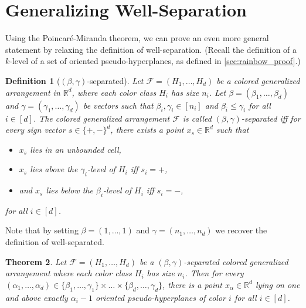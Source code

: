 \documentclass[11pt]{article}
\newtheorem{theorem}{Theorem}
\newtheorem{definition}[theorem]{Definition}
\begin{document}
\section{Generalizing Well-Separation}\label{sec:generalized_separation}
Using the Poincar\'{e}-Miranda theorem, we can prove an even more general statement by relaxing the definition of well-separation. (Recall the definition of a $k$-level of a set of oriented pseudo-hyperplanes, as defined in \cref{sec:rainbow_proof}.) 
%
\begin{definition}[$(\beta,\gamma)$-separated]
\label{def:generalized_separation}
Let $\mathcal{F}=(H_1, \dots, H_d)$ be a colored generalized arrangement in $\mathbb{R}^d$, where each color class $H_i$ has size $n_i$. Let $\beta=(\beta_1,\ldots,\beta_d)$ and $\gamma=(\gamma_1,\ldots,\gamma_d)$ be vectors such that $\beta_i, \gamma_i \in [n_i]$ and $\beta_i\leq \gamma_i$ for all $i \in [d]$.
The colored generalized arrangement $\mathcal{F}$ is called \emph{$(\beta,\gamma)$-separated} iff for every sign vector $s \in \{+, -\}^d$, there exists a point $x_s \in \mathbb{R}^d$ such that 
\begin{itemize}
	\item $x_s$ lies in an unbounded cell,
    \item $x_s$ lies above the $\gamma_i$-level of $H_i$ iff $s_i = +$,
    \item and $x_s$ lies below the $\beta_i$-level of $H_i$ iff $s_i = -$,
\end{itemize}
for all $i \in [d]$.
\end{definition}
%
Note that by setting $\beta=(1,\ldots, 1)$ and $\gamma=(n_1,\ldots,n_d)$ we recover the definition of well-separated.
%
\begin{theorem}
\label{thm:beta-gamma}
Let $\mathcal{F}=(H_1, \ldots,H_d)$ be a $(\beta,\gamma)$-separated colored generalized arrangement where each color class $H_i$ has size $n_i$. Then for every $(\alpha_1, \dots, \alpha_d) \in \{\beta_1,\ldots,\gamma_1\} \times \dots \times \{\beta_d,\ldots,\gamma_d\}$, there is a point $x_{\alpha} \in \mathbb{R}^d$ lying on one and above exactly $\alpha_i - 1$ oriented pseudo-hyperplanes of color $i$ for all $i \in [d]$.
\end{theorem}
%
\end{document}

